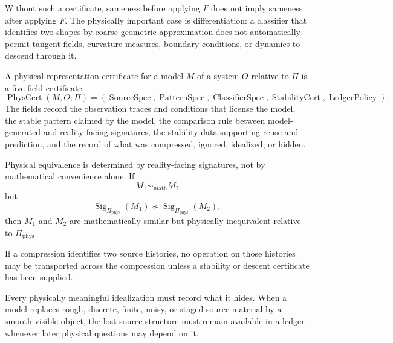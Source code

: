 Without such a certificate, sameness before applying $F$ does not imply sameness after applying $F$. The physically important case is differentiation: a classifier that identifies two shapes by coarse geometric approximation does not automatically permit tangent fields, curvature measures, boundary conditions, or dynamics to descend through it.

\begin{definition}
\label{def:physical-representation-certificate}
A physical representation certificate for a model $M$ of a system $O$ relative to $\Pi$ is a five-field certificate
$$
\operatorname{PhysCert}(M,O;\Pi)
=
(\operatorname{SourceSpec},
\operatorname{PatternSpec},
\operatorname{ClassifierSpec},
\operatorname{StabilityCert},
\operatorname{LedgerPolicy}).
$$
The fields record the observation traces and conditions that license the model, the stable pattern claimed by the model, the comparison rule between model-generated and reality-facing signatures, the stability data supporting reuse and prediction, and the record of what was compressed, ignored, idealized, or hidden.
\end{definition}

\begin{principle}
\label{prin:reality-signature-priority}
Physical equivalence is determined by reality-facing signatures, not by mathematical convenience alone. If
$$
M_1\sim_{\mathrm{math}}M_2
$$
but
$$
\operatorname{Sig}_{\Pi_{\mathrm{phys}}}(M_1)
\not\sim
\operatorname{Sig}_{\Pi_{\mathrm{phys}}}(M_2),
$$
then $M_1$ and $M_2$ are mathematically similar but physically inequivalent relative to $\Pi_{\mathrm{phys}}$.
\end{principle}

\begin{principle}
\label{prin:no-free-transfer-of-structure}
If a compression identifies two source histories, no operation on those histories may be transported across the compression unless a stability or descent certificate has been supplied.
\end{principle}

\begin{principle}
\label{prin:compression-requires-physical-memory}
Every physically meaningful idealization must record what it hides. When a model replaces rough, discrete, finite, noisy, or staged source material by a smooth visible object, the lost source structure must remain available in a ledger whenever later physical questions may depend on it.
\end{principle}

